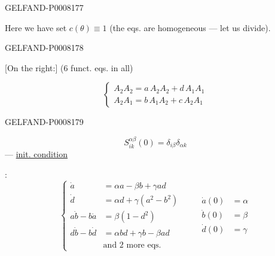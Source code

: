 \begin{GelfandAdjacentEvidence}{GELFAND-P000817}{7}


Here we have set \(c(\theta)\equiv1\) (the eqs. are homogeneous — let us divide).
\end{GelfandAdjacentEvidence}
\begin{GelfandAdjacentEvidence}{GELFAND-P000817}{8}


[On the right:] (6 funct. eqs. in all)

\begin{equation*}
\begin{cases}
A_2A_2=a\,A_2A_2+d\,A_1A_1\\
A_2A_1=b\,A_1A_2+c\,A_2A_1
\end{cases}\tag*{\((5)_2\)}
\end{equation*}
\end{GelfandAdjacentEvidence}
\begin{GelfandAdjacentEvidence}{GELFAND-P000817}{9}


\begin{equation*}
S^{\alpha\beta}_{ik}(0)=\delta_{i\beta}\delta_{\alpha k}\tag{7}
\end{equation*}
— \uline{init. condition}

:
\begin{equation*}
\left\{
\begin{aligned}
\dot a&=\alpha a-\beta b+\gamma ad\\
\dot d&=\alpha d+\gamma(a^2-b^2)\\
a\dot b-b\dot a&=\beta(1-d^2)\\
d\dot b-b\dot d&=\alpha bd+\gamma b-\beta ad\\
&\text{and 2 more eqs.}
\end{aligned}
\right.
\qquad
\begin{aligned}
\dot a(0)&=\alpha\\
\dot b(0)&=\beta\\
\dot d(0)&=\gamma
\end{aligned}\tag{8}
\end{equation*}
\end{GelfandAdjacentEvidence}



